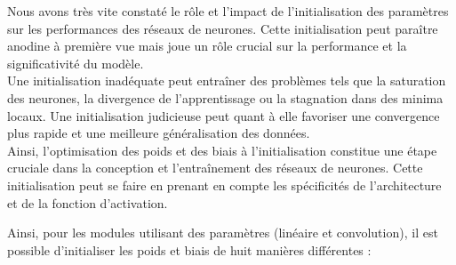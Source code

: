 \documentclass{article}
\begin{document}
Nous avons très vite constaté le rôle et l'impact de l'initialisation des paramètres sur les performances des réseaux de neurones. Cette initialisation peut paraître anodine à première vue mais joue un rôle crucial sur la performance et la significativité du modèle. \\
Une initialisation inadéquate peut entraîner des problèmes tels que la saturation des neurones, la divergence de l'apprentissage ou la stagnation dans des minima locaux. Une initialisation judicieuse peut quant à elle favoriser une convergence plus rapide et une meilleure généralisation des données. \\
Ainsi, l'optimisation des poids et des biais à l'initialisation constitue une étape cruciale dans la conception et l'entraînement des réseaux de neurones. Cette initialisation peut se faire en prenant en compte les spécificités de l'architecture et de la fonction d'activation.

Ainsi, pour les modules utilisant des paramètres (linéaire et convolution), il est possible d'initialiser les poids et biais de huit manières différentes :
\end{document}
